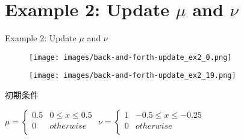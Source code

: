 \documentclass[aspectratio=169, dvipdfmx, 12pt]{beamer}
\begin{document}
\section{Example 2: Update $\mu$ and $\nu$}
\begin{frame}{Example 2: Update $\mu$ and $\nu$}
    \begin{figure}[htb]
        \begin{center}
            \begin{minipage}{0.45\hsize}
                \texttt{[image: images/back-and-forth-update\_ex2\_0.png]}
            \end{minipage}
            \begin{minipage}{0.45\hsize}
                \texttt{[image: images/back-and-forth-update\_ex2\_19.png]}
            \end{minipage}
        \end{center}
    \end{figure}
    \label{Example 2}

    初期条件
    \begin{center}
    $\mu = \left\{
        \begin{array}{ll}
            0.5 & 0 \le x \le 0.5 \\
            0 & otherwise \\
        \end{array}
    \right.
    $
    $\nu = \left\{
        \begin{array}{ll}
            1 & - 0.5 \le x \le - 0.25 \\
            0 & otherwise \\
        \end{array}
    \right.
    $
    \end{center}

\end{frame}
\end{document}
